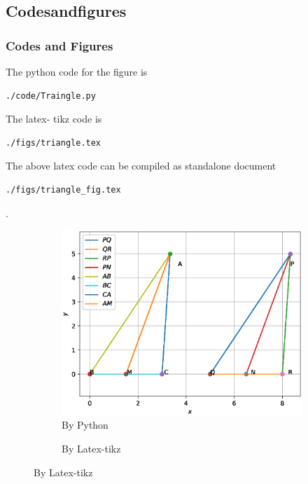 \documentclass{beamer}
\begin{document}
\subsection*{Codesandfigures}
\begin{frame}[fragile]
\frametitle{Codes and Figures}
\tiny
\begin{flushleft}
The python code for the figure is
\begin{lstlisting}
./code/Traingle.py
\end{lstlisting}
The latex- tikz code is
\begin{lstlisting}
./figs/triangle.tex
\end{lstlisting}
The above latex code can be compiled as standalone document
\begin{lstlisting} 
./figs/triangle_fig.tex
\end{lstlisting}
\end{flushleft}.
\begin{figure}
\begin{minipage}{0.45\linewidth}
\begin{subfigure}{0.5\textwidth}

\begin{flushleft}

\includegraphics[scale=0.275]{./figs/Triangle.eps}
\caption{\tiny By Python}
\end{flushleft}

\end{subfigure}
\end{minipage}
\hfill
\begin{minipage}{0.45\linewidth}
\begin{subfigure}{0.5\textwidth}
\begin{flushright}

\resizebox{2.0\columnwidth}{!}{}
\caption{\tiny By Latex-tikz}
\end{flushright}
\end{subfigure}
\end{minipage}
\end{figure}
\end{frame}
\end{document}
